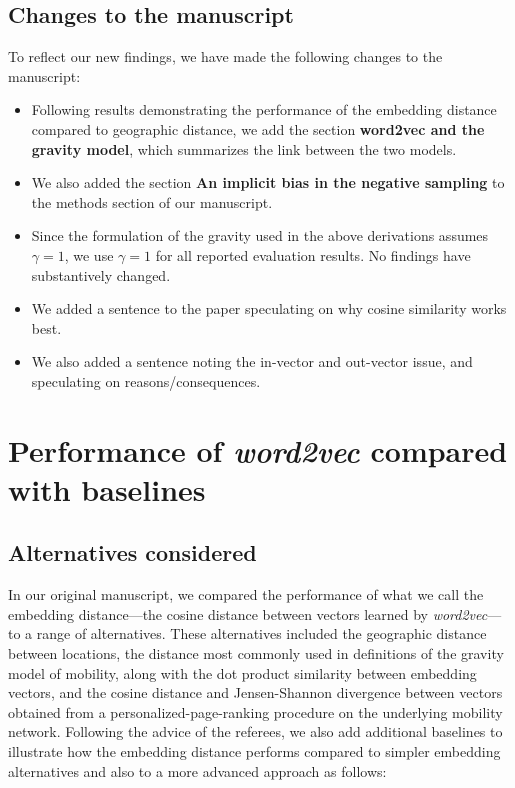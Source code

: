 \documentclass[12pt,a4paper]{article}
\begin{document}
\subsection{Changes to the manuscript}
To reflect our new findings, we have made the following changes to the manuscript:
\begin{itemize}
	\itemsep0em
	\item Following results demonstrating the performance of the embedding distance compared to geographic distance, we add the section \textbf{word2vec and the gravity model}, which summarizes the link between the two models.
	\item We also added the section \textbf{An implicit bias in the negative sampling} to the methods section of our manuscript.
	\item Since the formulation of the gravity used in the above derivations assumes $\gamma = 1$, we use $\gamma = 1$ for all reported evaluation results. No findings have substantively changed.
	\item We added a sentence to the paper speculating on why cosine similarity works best.
	\item We also added a sentence noting the in-vector and out-vector issue, and speculating on reasons/consequences.
\end{itemize}


%
%
\section{Performance of \textit{word2vec} compared with baselines}
\subsection{Alternatives considered}
In our original manuscript, we compared the performance of what we call the embedding distance---the cosine distance between vectors learned by \textit{word2vec}---to a range of alternatives.
These alternatives included the geographic distance between locations, the distance most commonly used in definitions of the gravity model of mobility, along with the dot product similarity between embedding vectors, and the cosine distance and Jensen-Shannon divergence between vectors obtained from a personalized-page-ranking procedure on the underlying mobility network. Following the advice of the referees, we also add additional baselines to illustrate how the embedding distance performs compared to simpler embedding alternatives and also to a more advanced approach as follows:
\end{document}
